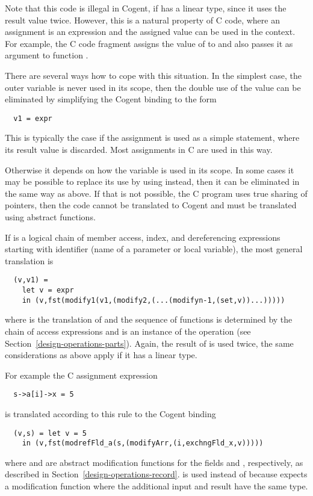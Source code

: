 Note that this code is illegal in Cogent, if  has a linear type, since it uses the result value twice. However, this
is a natural property of C code, where an assignment is an expression and the assigned value can be used in the context. For example,
the C code fragment  assigns the value of  to  and also passes it as argument to function .

There are several ways how to cope with this situation. In the simplest case, the outer variable  is never used in its
scope, then the double use of the value can be eliminated by simplifying the Cogent binding to the form
\begin{verbatim}
  v1 = expr
\end{verbatim}
This is typically the case if the assignment is used as a simple statement, where its result value is discarded. Most assignments
in C are used in this way.

Otherwise it depends on how the variable  is used in its scope. In some cases it may be possible to replace its use by 
using  instead, then it can be eliminated in the same way as above. If that is not possible, the C program uses true
sharing of pointers, then the code cannot be translated to Cogent and must be translated using abstract functions.

If  is a logical chain of  member access, index, and dereferencing expressions starting with identifier  
(name of a parameter or local variable), the most general translation is
\begin{verbatim}
  (v,v1) =
    let v = expr
    in (v,fst(modify1(v1,(modify2,(...(modifyn-1,(set,v))...)))))
\end{verbatim}
where  is the translation of  and the sequence of  functions is determined by the chain of access
expressions and  is an 
instance of the operation  (see Section~\ref{design-operations-parts}). Again, the result of  is used twice,
the same considerations as above apply if it has a linear type.

For example the C assignment expression
\begin{verbatim}
  s->a[i]->x = 5
\end{verbatim}
is translated according to this rule to the Cogent binding
\begin{verbatim}
  (v,s) = let v = 5
    in (v,fst(modrefFld_a(s,(modifyArr,(i,exchngFld_x,v)))))
\end{verbatim}
where  and  are abstract modification functions for the fields  and ,
respectively, as described in Section~\ref{design-operations-record}.  is used instead of 
because  expects a modification function where the additional input and result have the same type.

